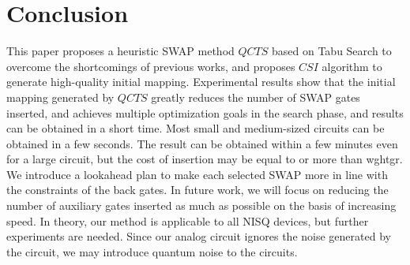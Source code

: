 \documentclass[runningheads]{llncs}
\begin{document}
 \section{Conclusion}
 \label{Conclusion}
 This paper proposes a heuristic SWAP method $QCTS$ based on Tabu Search to 
 overcome the shortcomings of previous works, 
 and proposes $CSI$  algorithm to generate high-quality initial mapping. 
 Experimental results show that the initial mapping generated by $QCTS$ greatly 
 reduces the number of SWAP gates inserted, 
 and achieves multiple optimization goals in the search phase, 
 and results can be obtained in a short time. 
 Most small and medium-sized circuits can be obtained in a few seconds. 
 The result can be obtained within a few minutes even for a large circuit, 
 but the cost of insertion may be equal to or more than wghtgr. 
 We introduce a lookahead plan to make each selected SWAP more in line with the 
 constraints of the back gates. 
 In future work, we will focus on reducing the number of auxiliary gates inserted as much as possible 
 on the basis of increasing speed. 
 In theory, our method is applicable to all NISQ devices, 
 but further experiments are needed. 
Since our analog circuit ignores the noise generated by the circuit,
we may introduce quantum noise to the circuits.
\appendix
\end{document}

